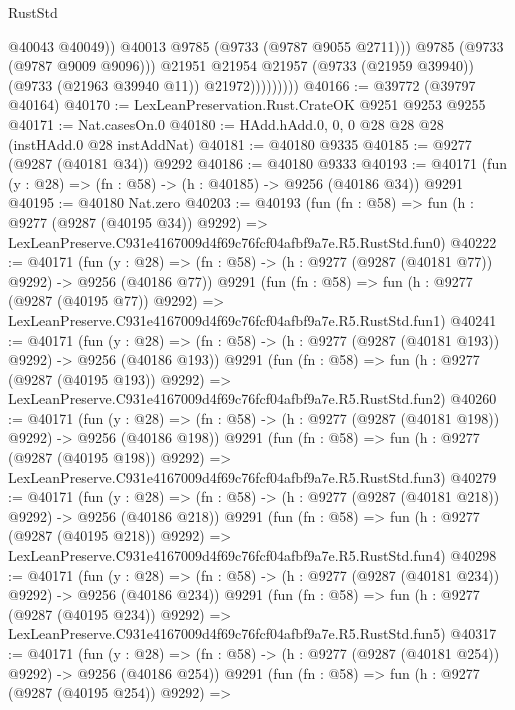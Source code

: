\begin{lexlean}{RustStd}
\begin{coremodule}
                              @40043
                              @40049))
                          @40013
                          @9785
                          (@9733 (@9787 @9055 @2711)))
                        @9785
                        (@9733 (@9787 @9009 @9096)))
                      @21951
                      @21954
                      @21957
                      (@9733 (@21959 @39940))
                      (@9733 (@21963 @39940 @11))
                      @21972)))))))))
@40166 := @39772 (@39797 @40164)
@40170 := LexLeanPreservation.Rust.CrateOK @9251 @9253 @9255
@40171 := Nat.casesOn.{0}
@40180 := HAdd.hAdd.{0, 0, 0} @28 @28 @28 (instHAdd.{0} @28 instAddNat)
@40181 := @40180 @9335
@40185 := @9277 (@9287 (@40181 @34)) @9292
@40186 := @40180 @9333
@40193 := @40171 (fun (y : @28) => (fn : @58) -> (h : @40185) -> @9256 (@40186 @34)) @9291
@40195 := @40180 Nat.zero
@40203 := @40193
    (fun (fn : @58) =>
    fun (h : @9277 (@9287 (@40195 @34)) @9292) =>
    LexLeanPreserve.C931e4167009d4f69c76fcf04afbf9a7e.R5.RustStd.fun0)
@40222 := @40171
    (fun (y : @28) => (fn : @58) -> (h : @9277 (@9287 (@40181 @77)) @9292) -> @9256 (@40186 @77))
    @9291
    (fun (fn : @58) =>
    fun (h : @9277 (@9287 (@40195 @77)) @9292) =>
    LexLeanPreserve.C931e4167009d4f69c76fcf04afbf9a7e.R5.RustStd.fun1)
@40241 := @40171
    (fun (y : @28) => (fn : @58) -> (h : @9277 (@9287 (@40181 @193)) @9292) -> @9256 (@40186 @193))
    @9291
    (fun (fn : @58) =>
    fun (h : @9277 (@9287 (@40195 @193)) @9292) =>
    LexLeanPreserve.C931e4167009d4f69c76fcf04afbf9a7e.R5.RustStd.fun2)
@40260 := @40171
    (fun (y : @28) => (fn : @58) -> (h : @9277 (@9287 (@40181 @198)) @9292) -> @9256 (@40186 @198))
    @9291
    (fun (fn : @58) =>
    fun (h : @9277 (@9287 (@40195 @198)) @9292) =>
    LexLeanPreserve.C931e4167009d4f69c76fcf04afbf9a7e.R5.RustStd.fun3)
@40279 := @40171
    (fun (y : @28) => (fn : @58) -> (h : @9277 (@9287 (@40181 @218)) @9292) -> @9256 (@40186 @218))
    @9291
    (fun (fn : @58) =>
    fun (h : @9277 (@9287 (@40195 @218)) @9292) =>
    LexLeanPreserve.C931e4167009d4f69c76fcf04afbf9a7e.R5.RustStd.fun4)
@40298 := @40171
    (fun (y : @28) => (fn : @58) -> (h : @9277 (@9287 (@40181 @234)) @9292) -> @9256 (@40186 @234))
    @9291
    (fun (fn : @58) =>
    fun (h : @9277 (@9287 (@40195 @234)) @9292) =>
    LexLeanPreserve.C931e4167009d4f69c76fcf04afbf9a7e.R5.RustStd.fun5)
@40317 := @40171
    (fun (y : @28) => (fn : @58) -> (h : @9277 (@9287 (@40181 @254)) @9292) -> @9256 (@40186 @254))
    @9291
    (fun (fn : @58) =>
    fun (h : @9277 (@9287 (@40195 @254)) @9292) =>

\end{coremodule}
\end{lexlean}
